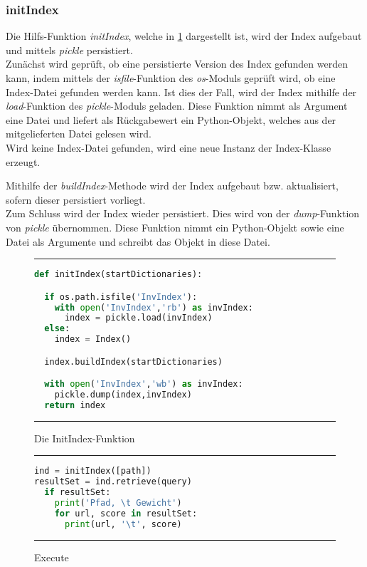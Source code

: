 \subsubsection{initIndex}\label{initIndex}
Die Hilfs-Funktion \textit{initIndex}, welche in \ref{fig:initIndex} dargestellt ist, wird der Index aufgebaut und mittels \textit{pickle} persistiert.
\\
Zunächst wird geprüft, ob eine persistierte Version des Index gefunden werden kann, indem mittels der \textit{isfile}-Funktion des \textit{os}-Moduls geprüft wird, ob eine Index-Datei gefunden werden kann.
Ist dies der Fall, wird der Index mithilfe der \textit{load}-Funktion des \textit{pickle}-Moduls geladen. Diese Funktion nimmt als Argument eine Datei und liefert als Rückgabewert ein Python-Objekt, welches aus der mitgelieferten Datei gelesen wird.
\\
Wird keine Index-Datei gefunden, wird eine neue Instanz der Index-Klasse erzeugt.

Mithilfe der \textit{buildIndex}-Methode wird der Index aufgebaut bzw. aktualisiert, sofern dieser persistiert vorliegt.
\\
Zum Schluss wird der Index wieder persistiert. Dies wird von der \textit{dump}-Funktion von \textit{pickle} übernommen. Diese Funktion nimmt ein Python-Objekt sowie eine Datei als Argumente und schreibt das Objekt in diese Datei.

\begin{figure}
	\rule{\textwidth}{0.4pt}
	\begin{lstlisting}[language=Python]
def initIndex(startDictionaries):

  if os.path.isfile('InvIndex'):
    with open('InvIndex','rb') as invIndex:
      index = pickle.load(invIndex)
  else:
    index = Index()

  index.buildIndex(startDictionaries)

  with open('InvIndex','wb') as invIndex:
    pickle.dump(index,invIndex)
  return index
	\end{lstlisting}
	\rule{\textwidth}{0.4pt}
	\caption{Die InitIndex-Funktion}
	\label{fig:initIndex}
\end{figure}

\begin{figure}
	\rule{\textwidth}{0.4pt}
		\begin{lstlisting}[language=Python]
ind = initIndex([path])
resultSet = ind.retrieve(query)
  if resultSet:
    print('Pfad, \t Gewicht')
    for url, score in resultSet:
      print(url, '\t', score)
		\end{lstlisting}
	\rule{\textwidth}{0.4pt}
	\caption{Execute}
	\label{fig:execute}
\end{figure}
